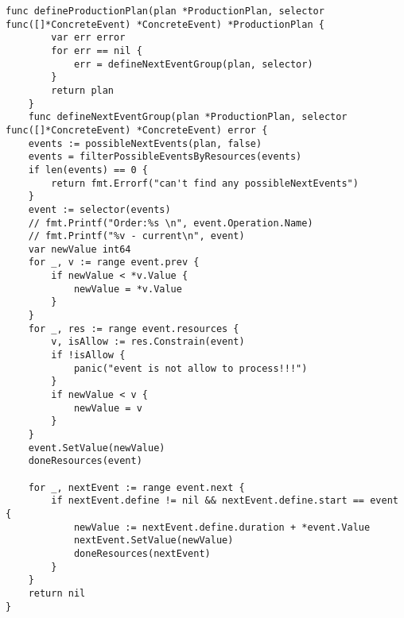 \begin{lstlisting}[language=Golang,caption={Планирование},label=lst:code5]
    func defineProductionPlan(plan *ProductionPlan, selector func([]*ConcreteEvent) *ConcreteEvent) *ProductionPlan {
        var err error
        for err == nil {
            err = defineNextEventGroup(plan, selector)
        }
        return plan
    }
    func defineNextEventGroup(plan *ProductionPlan, selector func([]*ConcreteEvent) *ConcreteEvent) error {
	events := possibleNextEvents(plan, false)
    events = filterPossibleEventsByResources(events)
    if len(events) == 0 {
		return fmt.Errorf("сan't find any possibleNextEvents")
	}
    event := selector(events)
	// fmt.Printf("Order:%s \n", event.Operation.Name)
	// fmt.Printf("%v - current\n", event)
	var newValue int64
	for _, v := range event.prev {
		if newValue < *v.Value {
			newValue = *v.Value
		}
	}
	for _, res := range event.resources {
		v, isAllow := res.Constrain(event)
		if !isAllow {
			panic("event is not allow to process!!!")
		}
		if newValue < v {
			newValue = v
		}
	}
	event.SetValue(newValue)
	doneResources(event)

	for _, nextEvent := range event.next {
		if nextEvent.define != nil && nextEvent.define.start == event {
			newValue := nextEvent.define.duration + *event.Value
			nextEvent.SetValue(newValue)
			doneResources(nextEvent)
		} 
	}
	return nil
}


\end{lstlisting}